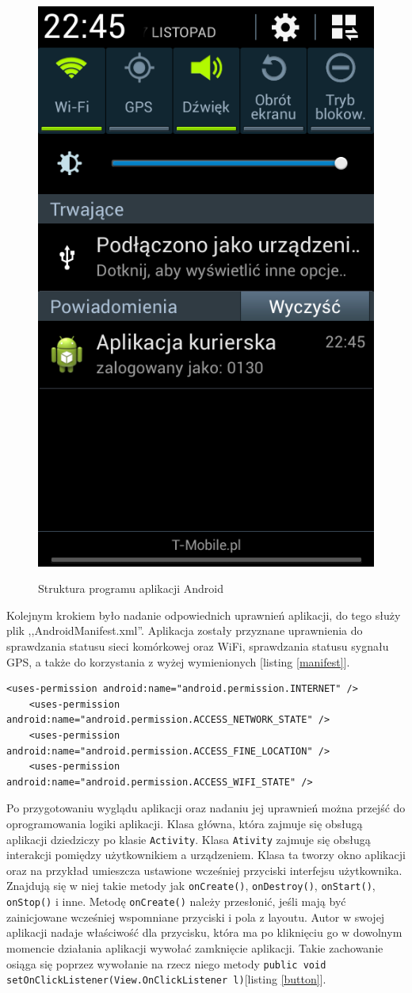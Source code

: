 \documentclass[eng,printmode,oneside]{mgr}
\begin{document}
\begin{figure}
{\includegraphics[width=25ex]{andBarZal.png}
\label{androidViewtask}
}
\vspace{-10pt}
 \caption{Struktura programu aplikacji Android}
\vspace{-10pt}

\end{figure}

Kolejnym krokiem było nadanie odpowiednich uprawnień aplikacji, do tego służy
plik ,,AndroidManifest.xml''. Aplikacja zostały przyznane uprawnienia do
sprawdzania statusu sieci komórkowej oraz WiFi, sprawdzania statusu sygnału
GPS, a także do korzystania z wyżej wymienionych [listing \ref{manifest}].

\begin{lstlisting}[caption=Nadanie uprawnień aplikacji Android,label=manifest]
	<uses-permission android:name="android.permission.INTERNET" />
	<uses-permission android:name="android.permission.ACCESS_NETWORK_STATE" />
	<uses-permission android:name="android.permission.ACCESS_FINE_LOCATION" />
	<uses-permission android:name="android.permission.ACCESS_WIFI_STATE" />
\end{lstlisting}


Po przygotowaniu wyglądu aplikacji oraz nadaniu jej uprawnień można przejść
do oprogramowania logiki aplikacji. Klasa główna, która zajmuje się obsługą
aplikacji dziedziczy po klasie \texttt{Activity}. Klasa \texttt{Ativity} zajmuje
się obsługą interakcji pomiędzy użytkownikiem a urządzeniem. Klasa ta tworzy okno aplikacji
oraz na przykład umieszcza ustawione wcześniej przyciski interfejsu użytkownika.
Znajdują się w niej takie metody jak \texttt{onCreate()}, \texttt{onDestroy()},
\texttt{onStart()}, \texttt{onStop()} i inne. Metodę \texttt{onCreate()} należy
przesłonić, jeśli mają być zainicjowane wcześniej wspomniane przyciski i pola z layoutu. Autor w swojej aplikacji nadaje
właściwość dla przycisku, która ma po kliknięciu go w dowolnym momencie
działania aplikacji wywołać zamknięcie aplikacji. Takie zachowanie osiąga się
poprzez wywołanie na rzecz niego metody \texttt{public void
setOnClickListener(View.OnClickListener l)}[listing \ref{button}].
\end{document}
